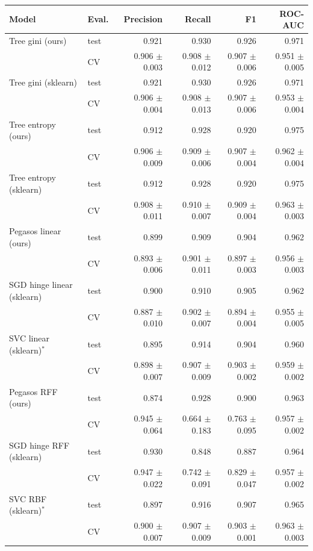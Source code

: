 \begin{tabular}{llrrrr}
\toprule
Model & Eval. & Precision & Recall & F1 & ROC-AUC \\
\midrule
Tree gini (ours) & test & 0.921 & 0.930 & 0.926 & 0.971 \\
 & CV & 0.906 $\pm$ 0.003 & 0.908 $\pm$ 0.012 & 0.907 $\pm$ 0.006 & 0.951 $\pm$ 0.005 \\
Tree gini (sklearn) & test & 0.921 & 0.930 & 0.926 & 0.971 \\
 & CV & 0.906 $\pm$ 0.004 & 0.908 $\pm$ 0.013 & 0.907 $\pm$ 0.006 & 0.953 $\pm$ 0.004 \\
Tree entropy (ours) & test & 0.912 & 0.928 & 0.920 & 0.975 \\
 & CV & 0.906 $\pm$ 0.009 & 0.909 $\pm$ 0.006 & 0.907 $\pm$ 0.004 & 0.962 $\pm$ 0.004 \\
Tree entropy (sklearn) & test & 0.912 & 0.928 & 0.920 & 0.975 \\
 & CV & 0.908 $\pm$ 0.011 & 0.910 $\pm$ 0.007 & 0.909 $\pm$ 0.004 & 0.963 $\pm$ 0.003 \\
Pegasos linear (ours) & test & 0.899 & 0.909 & 0.904 & 0.962 \\
 & CV & 0.893 $\pm$ 0.006 & 0.901 $\pm$ 0.011 & 0.897 $\pm$ 0.003 & 0.956 $\pm$ 0.003 \\
SGD hinge linear (sklearn) & test & 0.900 & 0.910 & 0.905 & 0.962 \\
 & CV & 0.887 $\pm$ 0.010 & 0.902 $\pm$ 0.007 & 0.894 $\pm$ 0.004 & 0.955 $\pm$ 0.005 \\
SVC linear (sklearn)$^{*}$ & test & 0.895 & 0.914 & 0.904 & 0.960 \\
 & CV & 0.898 $\pm$ 0.007 & 0.907 $\pm$ 0.009 & 0.903 $\pm$ 0.002 & 0.959 $\pm$ 0.002 \\
Pegasos RFF (ours) & test & 0.874 & 0.928 & 0.900 & 0.963 \\
 & CV & 0.945 $\pm$ 0.064 & 0.664 $\pm$ 0.183 & 0.763 $\pm$ 0.095 & 0.957 $\pm$ 0.002 \\
SGD hinge RFF (sklearn) & test & 0.930 & 0.848 & 0.887 & 0.964 \\
 & CV & 0.947 $\pm$ 0.022 & 0.742 $\pm$ 0.091 & 0.829 $\pm$ 0.047 & 0.957 $\pm$ 0.002 \\
SVC RBF (sklearn)$^{*}$ & test & 0.897 & 0.916 & 0.907 & 0.965 \\
 & CV & 0.900 $\pm$ 0.007 & 0.907 $\pm$ 0.009 & 0.903 $\pm$ 0.001 & 0.963 $\pm$ 0.003 \\
\bottomrule
\end{tabular}
